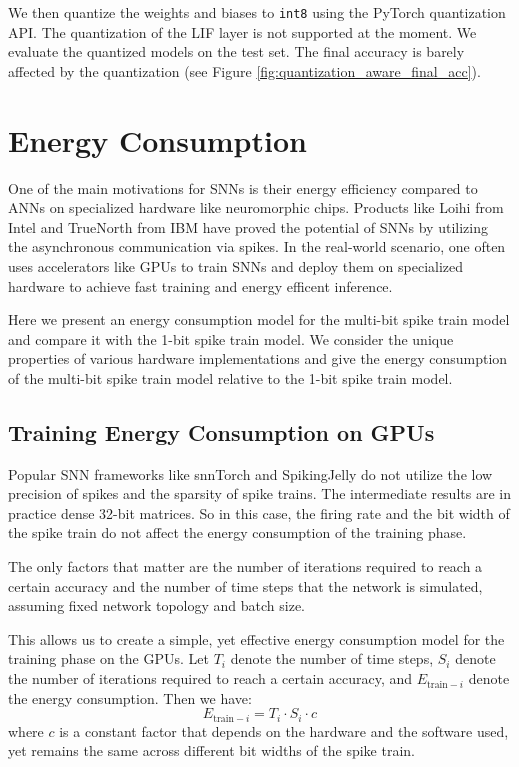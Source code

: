     We then quantize the weights and biases to \verb|int8| using the PyTorch quantization API. The quantization of the LIF layer is not supported at the moment. We evaluate the quantized models on the test set. The final accuracy is barely affected by the quantization (see Figure \ref{fig:quantization_aware_final_acc}). 

\section{Energy Consumption}
\label{sec:energy-consumption}
    One of the main motivations for SNNs is their energy efficiency compared to ANNs on specialized hardware like neuromorphic chips. Products like Loihi from Intel \cite{8259423} and TrueNorth from IBM \cite{7229264} have proved the potential of SNNs by utilizing the asynchronous communication via spikes. In the real-world scenario, one often uses accelerators like GPUs to train SNNs and deploy them on specialized hardware to achieve fast training and energy efficent inference. 

    Here we present an energy consumption model for the multi-bit spike train model and compare it with the 1-bit spike train model. We consider the unique properties of various hardware implementations and give the energy consumption of the multi-bit spike train model relative to the 1-bit spike train model. 

    \subsection{Training Energy Consumption on GPUs}
    \label{subsec:training_energy}
        Popular SNN frameworks like snnTorch and SpikingJelly do not utilize the low precision of spikes and the sparsity of spike trains. The intermediate results are in practice dense 32-bit matrices. So in this case, the firing rate and the bit width of the spike train do not affect the energy consumption of the training phase. 
    
        The only factors that matter are the number of iterations required to reach a certain accuracy and the number of time steps that the network is simulated, assuming fixed network topology and batch size. 
    
        This allows us to create a simple, yet effective energy consumption model for the training phase on the GPUs. Let $T_i$ denote the number of time steps, $S_i$ denote the number of iterations required to reach a certain accuracy, and $E_{\text{train}-i}$ denote the energy consumption. Then we have:
        \begin{equation}
            E_{\text{train}-i} = T_i \cdot S_i \cdot c
        \end{equation}
        where $c$ is a constant factor that depends on the hardware and the software used, yet remains the same across different bit widths of the spike train. 
    
